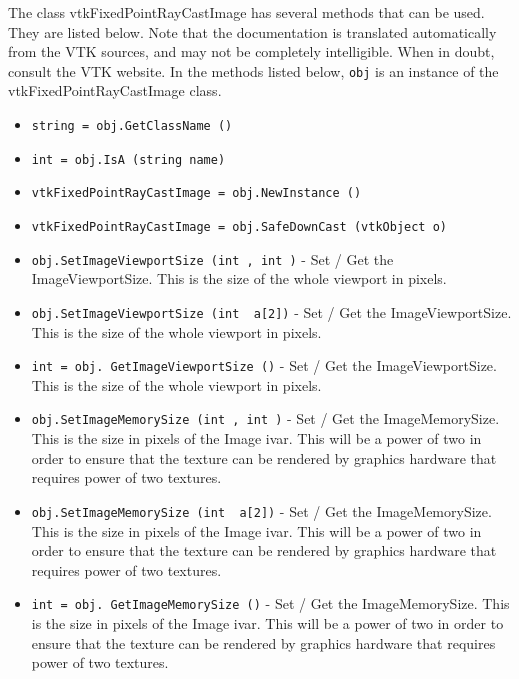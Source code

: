 The class vtkFixedPointRayCastImage has several methods that can be used.
  They are listed below.
Note that the documentation is translated automatically from the VTK sources,
and may not be completely intelligible.  When in doubt, consult the VTK website.
In the methods listed below, \verb|obj| is an instance of the vtkFixedPointRayCastImage class.
\begin{itemize}
\item  \verb|string = obj.GetClassName ()|

\item  \verb|int = obj.IsA (string name)|

\item  \verb|vtkFixedPointRayCastImage = obj.NewInstance ()|

\item  \verb|vtkFixedPointRayCastImage = obj.SafeDownCast (vtkObject o)|

\item  \verb|obj.SetImageViewportSize (int , int )| -  Set / Get the ImageViewportSize. This is the size of the
 whole viewport in pixels.

\item  \verb|obj.SetImageViewportSize (int  a[2])| -  Set / Get the ImageViewportSize. This is the size of the
 whole viewport in pixels.

\item  \verb|int = obj. GetImageViewportSize ()| -  Set / Get the ImageViewportSize. This is the size of the
 whole viewport in pixels.

\item  \verb|obj.SetImageMemorySize (int , int )| -  Set / Get the ImageMemorySize. This is the size in pixels
 of the Image ivar. This will be a power of two in order
 to ensure that the texture can be rendered by graphics
 hardware that requires power of two textures.

\item  \verb|obj.SetImageMemorySize (int  a[2])| -  Set / Get the ImageMemorySize. This is the size in pixels
 of the Image ivar. This will be a power of two in order
 to ensure that the texture can be rendered by graphics
 hardware that requires power of two textures.

\item  \verb|int = obj. GetImageMemorySize ()| -  Set / Get the ImageMemorySize. This is the size in pixels
 of the Image ivar. This will be a power of two in order
 to ensure that the texture can be rendered by graphics
 hardware that requires power of two textures.


\end{itemize}
